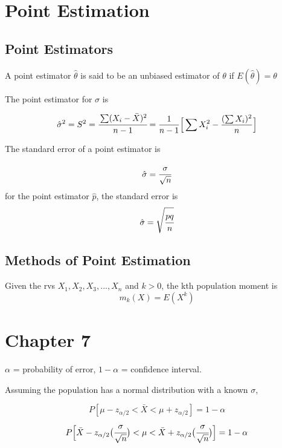 \documentclass[10pt,twoside,a4paper]{article}
\begin{document}
\begin{multicols*}{2}
\begin{flushleft}
	\section{Point Estimation}
	\subsection{Point Estimators}
	A point estimator $\hat{\theta}$ is said to be an unbiased estimator of $\theta$ if 
	$ E(\hat{\theta}) = \theta $

	The point estimator for $\sigma$ is 

	$$\hat{\sigma}^2 = S^2 = \cfrac{\sum (X_i - \bar{X})^2}{n-1} = \frac{1}{n-1}\Big[\sum X^2_i - \frac{(\sum X_i)^2}{n} \Big]$$
	
	The standard error of a point estimator is 

	$$ \hat{\sigma} = \cfrac{\sigma}{\sqrt{n}}$$
	for the point estimator $\hat{p}$, the standard error is 
	$$ \hat{\sigma} = \sqrt{\cfrac{pq}{n}} $$
	\subsection{Methods of Point Estimation}
	Given the rvs $X_1, X_2, X_3, ..., X_n$ and $k > 0$, the kth population moment is
	$$ m_k(X) = E(X^k) $$



	\section{Chapter 7}
	$\alpha$ = probability of error, $1 - \alpha$ = confidence interval.

	Assuming the population has a normal distribution with a known $\sigma$,

	$$ P[\mu - z_{\alpha/2} < \bar{X} < \mu + z_{\alpha/2}] = 1 - \alpha $$
	$$ P\Big[\bar{X} - z_{\alpha/2}\big(\cfrac{\sigma}{\sqrt{n}}\big) < \mu < \bar{X} + z_{\alpha/2}\big(\cfrac{\sigma}{\sqrt{n}}\big)\Big] = 1 - \alpha $$
	\end{flushleft}
	\end{multicols*}

	
\end{document}
